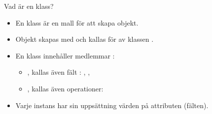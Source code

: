 



\begin{Slide}{Vad är en klass?}
\begin{itemize}
\item En klass är en mall för att skapa objekt.
\item Objekt skapas med  och kallas för   av klassen .
\item En klass innehåller medlemmar :
  \begin{itemize}
  \item {}, kallas även fält : , , 
  \item {}, kallas även operationer: 
  \end{itemize}
\item Varje instans har sin uppsättning värden på attributen (fälten).
\end{itemize}

\end{Slide}



